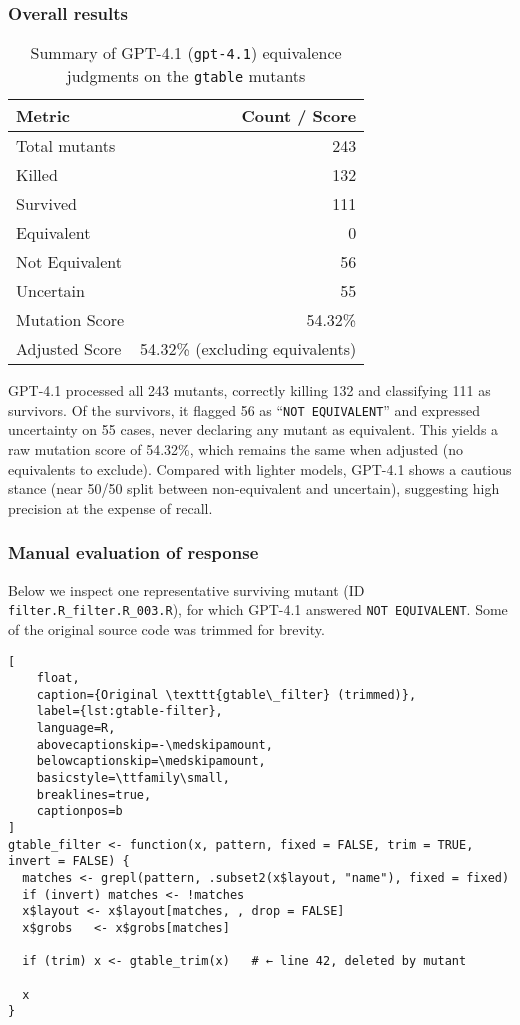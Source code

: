 \subsubsection{Overall results}

\begin{table}[ht]
  \centering
  \begin{tabular}{lr}
    \hline\hline
    \textbf{Metric} & \textbf{Count / Score} \\
    \hline
    Total mutants & 243 \\
    Killed & 132 \\
    Survived & 111 \\
    Equivalent & 0 \\
    Not Equivalent & 56 \\
    Uncertain & 55 \\
    Mutation Score & 54.32\% \\
    Adjusted Score & 54.32\% (excluding equivalents) \\
    \hline
  \end{tabular}
  \caption{Summary of GPT-4.1 (\texttt{gpt-4.1}) equivalence judgments on the \texttt{gtable} mutants}
  \label{tab:gpt41-overall}
\end{table}

GPT-4.1 processed all 243 mutants, correctly killing 132 and classifying 111 as survivors.  Of the survivors, it flagged 56 as “\texttt{NOT EQUIVALENT}” and expressed uncertainty on 55 cases, never declaring any mutant as equivalent.  This yields a raw mutation score of 54.32\%, which remains the same when adjusted (no equivalents to exclude).  Compared with lighter models, GPT-4.1 shows a cautious stance (near 50/50 split between non-equivalent and uncertain), suggesting high precision at the expense of recall.

\subsubsection{Manual evaluation of response}

Below we inspect one representative surviving mutant (ID \texttt{filter.R\_filter.R\_003.R}), for which GPT-4.1 answered \texttt{NOT EQUIVALENT}.  Some of the original source code was trimmed for brevity.

\begin{lstlisting}[
    float,
    caption={Original \texttt{gtable\_filter} (trimmed)},
    label={lst:gtable-filter},
    language=R,
    abovecaptionskip=-\medskipamount,
    belowcaptionskip=\medskipamount,
    basicstyle=\ttfamily\small,
    breaklines=true,
    captionpos=b
]
gtable_filter <- function(x, pattern, fixed = FALSE, trim = TRUE, invert = FALSE) {
  matches <- grepl(pattern, .subset2(x$layout, "name"), fixed = fixed)
  if (invert) matches <- !matches
  x$layout <- x$layout[matches, , drop = FALSE]
  x$grobs   <- x$grobs[matches]

  if (trim) x <- gtable_trim(x)   # ← line 42, deleted by mutant

  x
}
\end{lstlisting}


